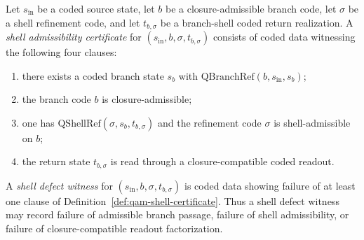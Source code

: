 \begin{center}
\end{center}

\begin{definition}\label{def:qam-shell-certificate}
Let $s_{\mathrm{in}}$ be a coded source state, let $b$ be a closure-admissible branch code, let $\sigma$ be a shell refinement code, and let $t_{b,\sigma}$ be a branch-shell coded return realization. A \emph{shell admissibility certificate} for $(s_{\mathrm{in}},b,\sigma,t_{b,\sigma})$ consists of coded data witnessing the following four clauses:
\begin{enumerate}[leftmargin=2em]
  \item there exists a coded branch state $s_b$ with $\mathrm{QBranchRef}(b,s_{\mathrm{in}},s_b)$;
  \item the branch code $b$ is closure-admissible;
  \item one has $\mathrm{QShellRef}(\sigma,s_b,t_{b,\sigma})$ and the refinement code $\sigma$ is shell-admissible on $b$;
  \item the return state $t_{b,\sigma}$ is read through a closure-compatible coded readout.
\end{enumerate}
\end{definition}

\begin{definition}\label{def:qam-shell-defect-witness}
A \emph{shell defect witness} for $(s_{\mathrm{in}},b,\sigma,t_{b,\sigma})$ is coded data showing failure of at least one clause of Definition~\ref{def:qam-shell-certificate}. Thus a shell defect witness may record failure of admissible branch passage, failure of shell admissibility, or failure of closure-compatible readout factorization.
\end{definition}

